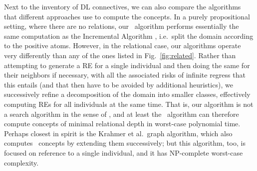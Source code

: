 Next to the inventory of DL connectives, we can also compare the
algorithms that different approaches use to compute the concepts.  In
a purely propositional setting, where there are no relations, our \el\
algorithm performs essentially the same computation as the Incremental
Algorithm \cite{Dale1995}, i.e.\ split the domain according to the
positive atoms.  However, in the relational case, our algorithms
operate very differently than any of the ones listed in
Fig.~\ref{fig:related}.  Rather than attempting to generate a RE for a
single individual and then doing the same for their neighbors if
necessary, with all the associated risks of infinite regress that this
entails (and that then have to be avoided by additional heuristics),
we successively refine a decomposition of the domain into smaller
classes, effectively computing REs for all individuals at the same
time.  That is, our algorithm is not a search algorithm in the sense
of \newcite{DBLP:conf/ijcai/BohnetD05}, and at least the \alc\
algorithm can therefore compute concepts of minimal relational depth
in worst-case polynomial time.  Perhaps closest in spirit is the
Krahmer et al.\ graph algorithm, which also computes \el\ concepts by
extending them successively; but this algorithm, too, is focused on
reference to a single individual, and it has NP-complete worst-case
complexity. 







